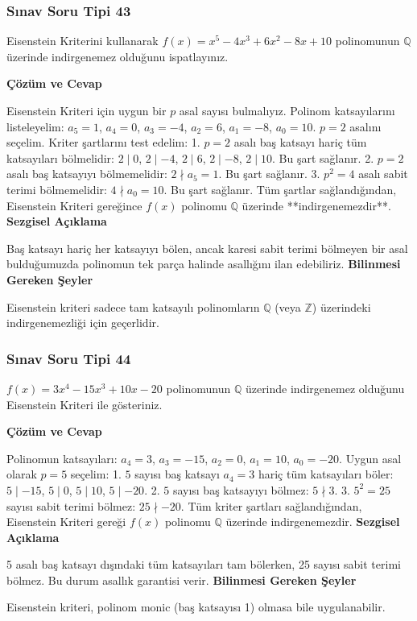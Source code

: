 \documentclass[11pt, a4paper]{article}
\newenvironment{cozum}{
    \vspace{0.5cm}
    \noindent\textcolor{green!60!black}{\faCheckCircle\enspace \textbf{\Large Çözüm ve Cevap}}\par\vspace{0.2cm}
}{}
\newenvironment{sezgisel}{
    \vspace{0.5cm}
    \noindent\textcolor{orange!80!black}{\faLightbulb\enspace \textbf{\Large Sezgisel Açıklama}}\par\vspace{0.2cm}
    \itshape
}{}
\newenvironment{bilgi}{
    \vspace{0.5cm}
    \noindent\textcolor{red!70!black}{\faExclamationTriangle\enspace \textbf{\Large Bilinmesi Gereken Şeyler}}\par\vspace{0.2cm}
}{}
\begin{document}
\subsubsection{Sınav Soru Tipi 43}
\begin{sinavbox}
Eisenstein Kriterini kullanarak $f(x) = x^5-4x^3+6x^2-8x+10$ polinomunun $\mathbb{Q}$ üzerinde indirgenemez olduğunu ispatlayınız.
\end{sinavbox}
\begin{cozum}
Eisenstein Kriteri için uygun bir $p$ asal sayısı bulmalıyız.
Polinom katsayılarını listeleyelim:
$a_5 = 1$, $a_4 = 0$, $a_3 = -4$, $a_2 = 6$, $a_1 = -8$, $a_0 = 10$.
$p = 2$ asalını seçelim. Kriter şartlarını test edelim:
1. $p = 2$ asalı baş katsayı hariç tüm katsayıları bölmelidir:
   $2 \mid 0$, $2 \mid -4$, $2 \mid 6$, $2 \mid -8$, $2 \mid 10$. Bu şart sağlanır.
2. $p = 2$ asalı baş katsayıyı bölmemelidir:
   $2 \nmid a_5 = 1$. Bu şart sağlanır.
3. $p^2 = 4$ asalı sabit terimi bölmemelidir:
   $4 \nmid a_0 = 10$. Bu şart sağlanır.
Tüm şartlar sağlandığından, Eisenstein Kriteri gereğince $f(x)$ polinomu $\mathbb{Q}$ üzerinde **indirgenemezdir**.
\end{cozum}
\begin{sezgisel}
Baş katsayı hariç her katsayıyı bölen, ancak karesi sabit terimi bölmeyen bir asal bulduğumuzda polinomun tek parça halinde asallığını ilan edebiliriz.
\end{sezgisel}
\begin{bilgi}
Eisenstein kriteri sadece tam katsayılı polinomların $\mathbb{Q}$ (veya $\mathbb{Z}$) üzerindeki indirgenemezliği için geçerlidir.
\end{bilgi}

\newpage
\subsubsection{Sınav Soru Tipi 44}
\begin{sinavbox}
$f(x) = 3x^4-15x^3+10x-20$ polinomunun $\mathbb{Q}$ üzerinde indirgenemez olduğunu Eisenstein Kriteri ile gösteriniz.
\end{sinavbox}
\begin{cozum}
Polinomun katsayıları: $a_4 = 3$, $a_3 = -15$, $a_2 = 0$, $a_1 = 10$, $a_0 = -20$.
Uygun asal olarak $p = 5$ seçelim:
1. $5$ sayısı baş katsayı $a_4=3$ hariç tüm katsayıları böler:
   $5 \mid -15$, $5 \mid 0$, $5 \mid 10$, $5 \mid -20$.
2. $5$ sayısı baş katsayıyı bölmez: $5 \nmid 3$.
3. $5^2 = 25$ sayısı sabit terimi bölmez: $25 \nmid -20$.
Tüm kriter şartları sağlandığından, Eisenstein Kriteri gereği $f(x)$ polinomu $\mathbb{Q}$ üzerinde indirgenemezdir.
\end{cozum}
\begin{sezgisel}
5 asalı baş katsayı dışındaki tüm katsayıları tam bölerken, 25 sayısı sabit terimi bölmez. Bu durum asallık garantisi verir.
\end{sezgisel}
\begin{bilgi}
Eisenstein kriteri, polinom monic (baş katsayısı 1) olmasa bile uygulanabilir.
\end{bilgi}
\end{document}
